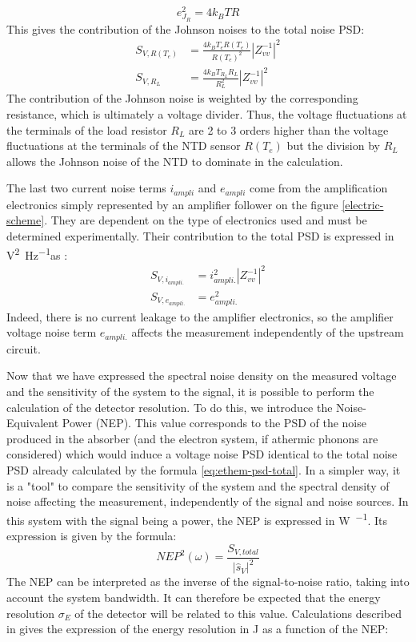 \begin{equation}
e_{J_R}^2 = 4k_B T R
\end{equation}
This gives the contribution of the Johnson noises to the total noise PSD:
\begin{align}
S_{V,R(T_e)} &= \frac{4 k_B T_e R(T_e)}{R(T_e)^2} \left\vert Z_{vv}^{-1}\right\vert^2
\\
S_{V,R_L} &= \frac{4 k_B T_{R_L} R_L}{R_L^2} \left\vert Z_{vv}^{-1}\right\vert^2
\end{align}
The contribution of the Johnson noise is weighted by the corresponding resistance, which is ultimately a voltage divider. Thus, the voltage fluctuations at the terminals of the load resistor $R_L$ are 2 to 3 orders higher than the voltage fluctuations at the terminals of the NTD sensor $R(T_e)$ but the division by $R_L$ allows the Johnson noise of the NTD to dominate in the calculation.

The last two current noise terms $i_{ampli}$ and $e_{ampli}$ come from the amplification electronics simply represented by an amplifier follower on the figure \ref{electric-scheme}. They are dependent on the type of electronics used and must be determined experimentally. Their contribution to the total PSD is expressed in \si{\volt^2\per\Hz}as :
\begin{align}
\label{eq:ethem-noise-ampli}
S_{V,i_{ampli.}} &= i_{ampli.}^2 \left\vert Z_{vv}^{-1}\right\vert^2
\\
S_{V,e_{ampli.}} &= e_{ampli.}^2
\end{align}
Indeed, there is no current leakage to the amplifier electronics, so the amplifier voltage noise term $e_{ampli.}$ affects the measurement independently of the upstream circuit.

Now that we have expressed the spectral noise density on the measured voltage and the sensitivity of the system to the signal, it is possible to perform the calculation of the detector resolution. To do this, we introduce the Noise-Equivalent Power (NEP). This value corresponds to the PSD of the noise produced in the absorber (and the electron system, if athermic phonons are considered) which would induce a voltage noise PSD identical to the total noise PSD already calculated by the formula \ref{eq:ethem-psd-total}. In a simpler way, it is a "tool" to compare the sensitivity of the system and the spectral density of noise affecting the measurement, independently of the signal and noise sources. In this system with the signal being a power, the NEP is expressed in \si{\watt\per\sqrthz}. Its expression is given by the formula:
\begin{equation}
\label{eq:nep}
NEP^2(\omega) =  \frac{S_{V,total}}{|\hat{s}_V|^2}
\end{equation}
The NEP can be interpreted as the inverse of the signal-to-noise ratio, taking into account the system bandwidth. It can therefore be expected that the energy resolution $\sigma_E$ of the detector will be related to this value. Calculations described in \cite{Enss:2005md} gives the expression of the energy resolution in \si{\joule} as a function of the NEP:

